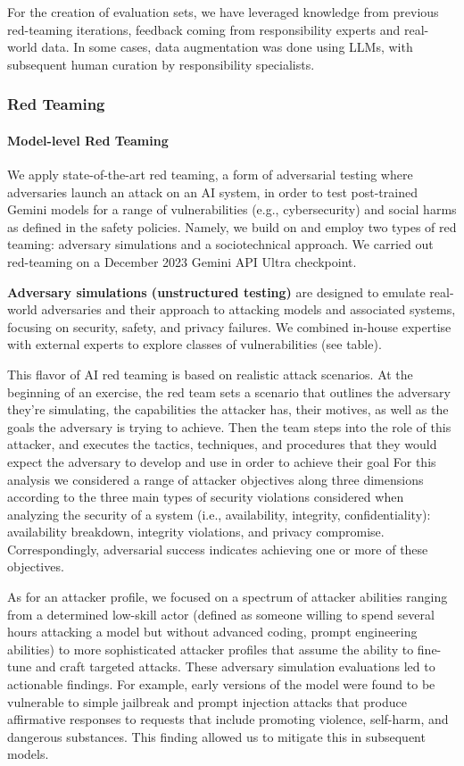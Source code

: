 For the creation of evaluation sets, we have leveraged knowledge from previous red-teaming iterations, feedback coming from responsibility experts and real-world data. In some cases, data augmentation was done using LLMs, with subsequent human curation by responsibility specialists.

\subsubsection{Red Teaming}

\paragraph{Model-level Red Teaming} 

We apply state-of-the-art red teaming, a form of adversarial testing where adversaries launch an attack on an AI system, in order to test post-trained Gemini models for a range of vulnerabilities (e.g., cybersecurity) and social harms as defined in the safety policies. Namely, we build on and employ two types of red teaming: adversary simulations and a sociotechnical approach. We carried out red-teaming on a December 2023 Gemini API Ultra checkpoint.  

\textbf{Adversary simulations (unstructured testing)} are designed to emulate real-world adversaries and their approach to attacking models and associated systems, focusing on security, safety, and privacy failures. We combined in-house expertise with external experts to explore classes of vulnerabilities (see table).  

This flavor of AI red teaming is based on realistic attack scenarios. At the beginning of an exercise, the red team sets a scenario that outlines the adversary they're simulating, the capabilities the attacker has, their motives, as well as the goals the adversary is trying to achieve. Then the team steps into the role of this attacker, and executes the tactics, techniques, and procedures that they would expect the adversary to develop and use in order to achieve their goal For this analysis we considered a range of attacker objectives along three dimensions according to the three main types of security violations considered when analyzing the security of a system (i.e., availability, integrity, confidentiality): availability breakdown, integrity violations, and privacy compromise. Correspondingly, adversarial success indicates achieving one or more of these objectives. 

As for an attacker profile, we focused on a spectrum of attacker abilities ranging from a determined low-skill actor (defined as someone willing to spend several hours attacking a model but without advanced coding, prompt engineering abilities) to more sophisticated attacker profiles that assume the ability to fine-tune and craft targeted attacks. These adversary simulation evaluations led to actionable findings. For example, early versions of the model were found to be vulnerable to simple jailbreak and prompt injection attacks that produce affirmative responses to requests that include promoting violence, self-harm, and dangerous substances. This finding allowed us to mitigate this in subsequent models.

